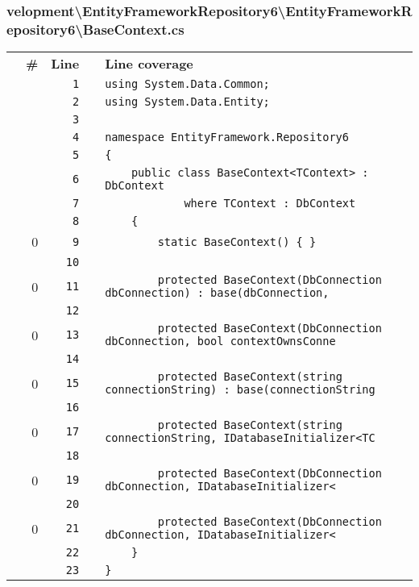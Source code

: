 \documentclass[a4paper,10pt]{article}
\begin{document}
\subsubsection{velopment\textbackslash EntityFrameworkRepository6\textbackslash EntityFrameworkRepository6\textbackslash BaseContext.cs}
\begin{longtable}[l]{lrrll}
\textbf{} & \textbf{\#} & \textbf{Line} & \textbf{} & \textbf{Line coverage}\\
\cellcolor{gray} &  & \verb~1~ & & \verb~using System.Data.Common;~\\
\cellcolor{gray} &  & \verb~2~ & & \verb~using System.Data.Entity;~\\
\cellcolor{gray} &  & \verb~3~ & & \verb~~\\
\cellcolor{gray} &  & \verb~4~ & & \verb~namespace EntityFramework.Repository6~\\
\cellcolor{gray} &  & \verb~5~ & & \verb~{~\\
\cellcolor{gray} &  & \verb~6~ & & \verb~    public class BaseContext<TContext> : DbContext~\\
\cellcolor{gray} &  & \verb~7~ & & \verb~            where TContext : DbContext~\\
\cellcolor{gray} &  & \verb~8~ & & \verb~    {~\\
\cellcolor{red} & 0 & \verb~9~ & & \verb~        static BaseContext() { }~\\
\cellcolor{gray} &  & \verb~10~ & & \verb~~\\
\cellcolor{red} & 0 & \verb~11~ & & \verb~        protected BaseContext(DbConnection dbConnection) : base(dbConnection, ~\\
\cellcolor{gray} &  & \verb~12~ & & \verb~~\\
\cellcolor{red} & 0 & \verb~13~ & & \verb~        protected BaseContext(DbConnection dbConnection, bool contextOwnsConne~\\
\cellcolor{gray} &  & \verb~14~ & & \verb~~\\
\cellcolor{red} & 0 & \verb~15~ & & \verb~        protected BaseContext(string connectionString) : base(connectionString~\\
\cellcolor{gray} &  & \verb~16~ & & \verb~~\\
\cellcolor{red} & 0 & \verb~17~ & & \verb~        protected BaseContext(string connectionString, IDatabaseInitializer<TC~\\
\cellcolor{gray} &  & \verb~18~ & & \verb~~\\
\cellcolor{red} & 0 & \verb~19~ & & \verb~        protected BaseContext(DbConnection dbConnection, IDatabaseInitializer<~\\
\cellcolor{gray} &  & \verb~20~ & & \verb~~\\
\cellcolor{red} & 0 & \verb~21~ & & \verb~        protected BaseContext(DbConnection dbConnection, IDatabaseInitializer<~\\
\cellcolor{gray} &  & \verb~22~ & & \verb~    }~\\
\cellcolor{gray} &  & \verb~23~ & & \verb~}~\\
\end{longtable}
\newpage
\end{document}
